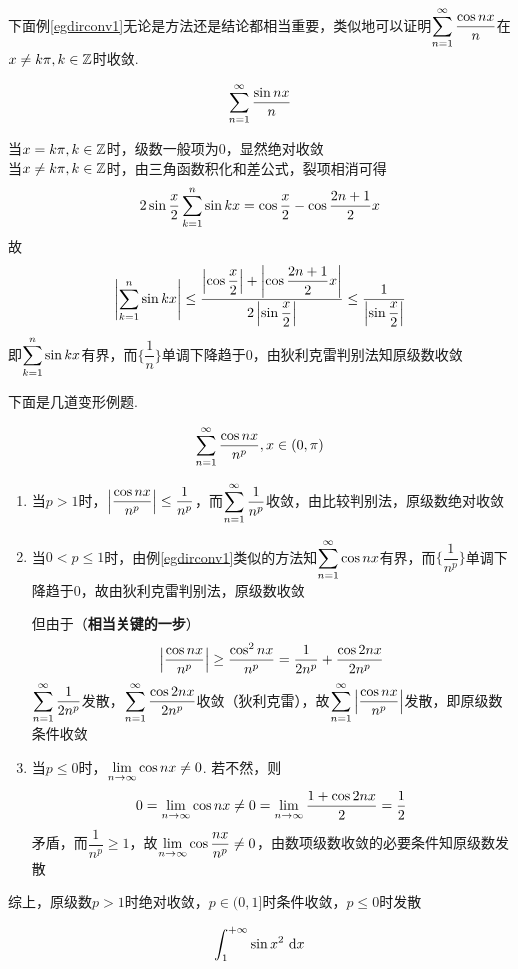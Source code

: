 \par 下面例\ref{egdirconv1}无论是方法还是结论都相当重要，类似地可以证明$\displaystyle\sum_{n=1}^{\infty}\dfrac{\cos nx}{n}$在$x\neq k\pi,k\in\mathbb{Z}$时收敛.
\begin{example}
\[\displaystyle\sum_{n=1}^{\infty}\dfrac{\sin nx}{n}\]
\label{egdirconv1}
\end{example}
\begin{analysis}
当$x=k\pi,k\in\mathbb{Z}$时，级数一般项为$0$，显然绝对收敛\\
当$x\neq k\pi,k\in\mathbb{Z}$时，由三角函数积化和差公式，裂项相消可得
\[2\sin\dfrac{x}{2}\displaystyle\sum_{k=1}^{n}\sin kx=\cos\dfrac{x}{2}-\cos\dfrac{2n+1}{2}x\]
故
\[\left|\displaystyle\sum_{k=1}^{n}\sin kx\right|\leq\dfrac{\left|\cos\dfrac{x}{2}\right|+\left|\cos\dfrac{2n+1}{2}x\right|}{2\left|\sin\dfrac{x}{2}\right|}\leq\dfrac{1}{\left|\sin\dfrac{x}{2}\right|}\]
即$\displaystyle\sum_{k=1}^{n}\sin kx$有界，而$\{\dfrac{1}{n}\}$单调下降趋于$0$，由狄利克雷判别法知原级数收敛
\end{analysis}
\par 下面是几道变形例题.
\begin{example}
\[\displaystyle\sum_{n=1}^{\infty}\frac{\cos nx}{n^p},x\in(0,\pi)\]
\end{example}
\begin{analysis}
\begin{enumerate}
	\item 当$p>1$时，$\left|\dfrac{\cos nx}{n^p}\right|\leq\dfrac{1}{n^p}$，而$\displaystyle\sum_{n=1}^{\infty}\dfrac{1}{n^p}$收敛，由比较判别法，原级数绝对收敛\par
	\item 当$0<p\leq 1$时，由例\ref{egdirconv1}类似的方法知$\displaystyle\sum_{n=1}^{\infty}\cos nx$有界，而$\{\dfrac{1}{n^p}\}$单调下降趋于$0$，故由狄利克雷判别法，原级数收敛\par
但由于（\textbf{相当关键的一步}）
\[\left|\dfrac{\cos nx}{n^p}\right|\geq\dfrac{\cos^2 nx}{n^p}=\dfrac{1}{2n^p}+\dfrac{\cos 2nx}{2n^p}\]
$\displaystyle\sum_{n=1}^{\infty}\dfrac{1}{2n^p}$发散，$\displaystyle\sum_{n=1}^{\infty}\dfrac{\cos 2nx}{2n^p}$收敛（狄利克雷），故$\displaystyle\sum_{n=1}^{\infty}\left|\dfrac{\cos nx}{n^p}\right|$发散，即原级数条件收敛\par
	\item 当$p\leq 0$时，$\displaystyle\lim_{n\to\infty}\cos nx\neq 0$. 若不然，则
\[0=\displaystyle\lim_{n\to\infty}\cos nx\neq 0=\displaystyle\lim_{n\to\infty}\dfrac{1+\cos 2nx}{2}=\dfrac{1}{2}\]
矛盾，而$\dfrac{1}{n^p}\geq 1$，故$\displaystyle\lim_{n\to\infty}\cos\dfrac{nx}{n^p}\neq 0$，由数项级数收敛的必要条件知原级数发散
\end{enumerate}
综上，原级数$p>1$时绝对收敛，$p\in(0,1]$时条件收敛，$p\leq 0$时发散
\end{analysis}
\begin{example}
\label{countereg_conver_integ}
\[\displaystyle\int_{1}^{+\infty}{\sin x^2}\,\,\mathrm{d} x\]
\end{example}
